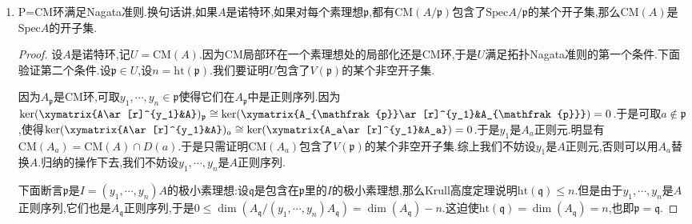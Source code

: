 \begin{enumerate}
\begin{proof}
    	由于所有伴随素理想的并就是所有零因子,于是$x_1\in A$是$A$正则元当且仅当$x_1$是$A/I^i$正则元$\forall i\ge1$.设$x_1$是$A$正则元,记$A'=A/x_1A$,记$B=A/I$,记$B'=B/x_1B$,记$I'=I/x_1I$,记$I'=(x_1A+I)/x_1A\cong I/(x_1A\cap I)=I/x_1I$,这里最后一个等式是因为$x_1$是$A/I$正则元.于是$B'=A'/I'$.再记$(I^i)'=(x_1A+I^i/xA)$,那么有$(I^i)'/(I^{i+1})'=(x_1A+I^i)/(x_1A+I^{i+1})\cong I^i/(I^i\cap(x_1A+I^{i+1}))\cong I^i/(x_1I^i+I^{i+1})$.这里最后一个等式是因为$x_1$是$A/I^i$正则元.于是$(I^i)'/(I^{i+1})'\cong\mathrm{coker}(\xymatrix{I^i/I^{i+1}\ar[r]^{x_1}&I^i/I^{i+1}})$是一个自由$B'=A'/I'$模.于是依旧按照第一段的讨论,有$x_2\in A$是$A'$正则元当且仅当$x_2$是$B'=A'/I'$正则元.归纳操作下去得到结论.
    \end{proof}
    \item P=CM环满足Nagata准则.换句话讲,如果$A$是诺特环,如果对每个素理想$\mathfrak{p}$,都有$\mathrm{CM}(A/\mathfrak{p})$包含了$\mathrm{Spec}A/\mathfrak{p}$的某个开子集,那么$\mathrm{CM}(A)$是$\mathrm{Spec}A$的开子集.
    \begin{proof}
    	
    	设$A$是诺特环,记$U=\mathrm{CM}(A)$.因为CM局部环在一个素理想处的局部化还是CM环,于是$U$满足拓扑Nagata准则的第一个条件.下面验证第二个条件.设$\mathfrak{p}\in U$,设$n=\mathrm{ht}(\mathfrak{p})$.我们要证明$U$包含了$V(\mathfrak{p})$的某个非空开子集.
    	
    	\qquad
    	
    	因为$A_{\mathfrak{p}}$是CM环,可取$y_1,\cdots,y_n\in\mathfrak{p}$使得它们在$A_{\mathfrak{p}}$中是正则序列.因为$\ker(\xymatrix{A\ar[r]^{y_1}&A})_{\mathfrak{p}}\cong\ker(\xymatrix{A_{\mathfrak{p}}\ar[r]^{y_1}&A_{\mathfrak{p}}})=0$.于是可取$a\not\in\mathfrak{p}$,使得$\ker(\xymatrix{A\ar[r]^{y_1}&A})_a\cong\ker(\xymatrix{A_a\ar[r]^{y_1}&A_a})=0$.于是$y_1$是$A_a$正则元.明显有$\mathrm{CM}(A_a)=\mathrm{CM}(A)\cap D(a)$.于是只需证明$\mathrm{CM}(A_a)$包含了$V(\mathfrak{p})$的某个非空开子集.综上我们不妨设$y_1$是$A$正则元,否则可以用$A_a$替换$A$.归纳的操作下去,我们不妨设$y_1,\cdots,y_n$是$A$正则序列.
    	
    	\qquad
    	
    	下面断言$\mathfrak{p}$是$I=(y_1,\cdots,y_n)A$的极小素理想:设$\mathfrak{q}$是包含在$\mathfrak{p}$里的$I$的极小素理想,那么Krull高度定理说明$\mathrm{ht}(\mathfrak{q})\le n$.但是由于$y_1,\cdots,y_n$是$A$正则序列,它们也是$A_{\mathfrak{q}}$正则序列,于是$0\le\dim(A_{\mathfrak{q}}/(y_1,\cdots,y_n)A_{\mathfrak{q}})=\dim(A_{\mathfrak{q}})-n$.这迫使$\mathrm{ht}(\mathfrak{q})=\dim(A_{\mathfrak{q}})=n$,也即$\mathfrak{p}=\mathfrak{q}$.
    	

\end{proof}
\end{enumerate}
